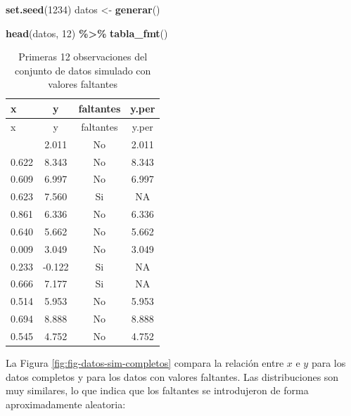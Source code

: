 \documentclass[
  spanish,
  12pt,
]{book}
\newenvironment{Shaded}{\begin{snugshade}}{\end{snugshade}}
\newcommand{\DecValTok}[1]{\textcolor[rgb]{0.00,0.00,0.81}{#1}}
\newcommand{\FunctionTok}[1]{\textcolor[rgb]{0.13,0.29,0.53}{\textbf{#1}}}
\newcommand{\NormalTok}[1]{#1}
\newcommand{\OtherTok}[1]{\textcolor[rgb]{0.56,0.35,0.01}{#1}}
\newcommand{\SpecialCharTok}[1]{\textcolor[rgb]{0.81,0.36,0.00}{\textbf{#1}}}
\begin{document}
\begin{Shaded}
\begin{Highlighting}[]
\FunctionTok{set.seed}\NormalTok{(}\DecValTok{1234}\NormalTok{)}
\NormalTok{datos }\OtherTok{\textless{}{-}} \FunctionTok{generar}\NormalTok{()}
\end{Highlighting}
\end{Shaded}

\begin{Shaded}
\begin{Highlighting}[]
\FunctionTok{head}\NormalTok{(datos, }\DecValTok{12}\NormalTok{) }\SpecialCharTok{\%\textgreater{}\%} \FunctionTok{tabla\_fmt}\NormalTok{()}
\end{Highlighting}
\end{Shaded}

\begin{longtable}[]{@{}lccc@{}}
\caption{\label{tab:tab-datos-simulados}Primeras 12 observaciones del conjunto de datos simulado con valores faltantes}\tabularnewline
\toprule\noalign{}
x & y & faltantes & y.per \\
\midrule\noalign{}
\endfirsthead
\toprule\noalign{}
x & y & faltantes & y.per \\
\midrule\noalign{}
\endhead
\bottomrule\noalign{}
\endlastfoot
0.114 & 2.011 & No & 2.011 \\
0.622 & 8.343 & No & 8.343 \\
0.609 & 6.997 & No & 6.997 \\
0.623 & 7.560 & Si & NA \\
0.861 & 6.336 & No & 6.336 \\
0.640 & 5.662 & No & 5.662 \\
0.009 & 3.049 & No & 3.049 \\
0.233 & -0.122 & Si & NA \\
0.666 & 7.177 & Si & NA \\
0.514 & 5.953 & No & 5.953 \\
0.694 & 8.888 & No & 8.888 \\
0.545 & 4.752 & No & 4.752 \\
\end{longtable}

La Figura \ref{fig:fig-datos-sim-completos} compara la relación entre \(x\) e \(y\) para los datos completos y para los datos con valores faltantes. Las distribuciones son muy similares, lo que indica que los faltantes se introdujeron de forma aproximadamente aleatoria:
\end{document}
